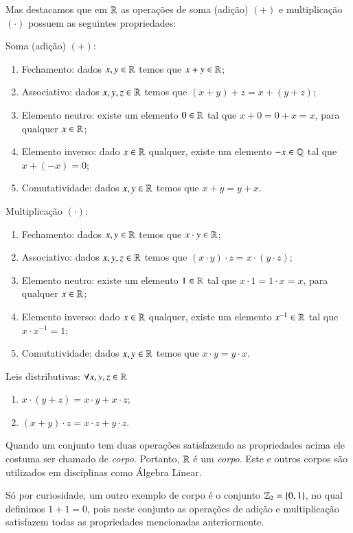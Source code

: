  Mas destacamos que em $\mathbb{R}$ as operações de soma (adição) $(+)$ e multiplicação $(\cdot)$ possuem as seguintes propriedades:

 Soma (adição) $(+)$:
 \begin{enumerate}[1)]
 \item Fechamento: dados $x, y \in \mathbb{R}$ temos que $x+y \in \mathbb{R}$;
 \item Associativo: dados $x, y, z \in \mathbb{R}$ temos que $(x+y)+z= x+(y+z)$;
 \item Elemento neutro: existe um elemento $0 \in \mathbb{R}$ tal que $x+0=0+x=x$, para qualquer $x \in \mathbb{R}$;
 \item Elemento inverso: dado $x \in \mathbb{R}$ qualquer, existe um elemento $-x \in \mathbb{Q}$ tal que $x+(-x)=0$;
 \item Comutatividade: dados $x, y \in \mathbb{R}$ temos que $x+y= y+x$.
 \end{enumerate}

  Multiplicação $(\cdot)$:
 \begin{enumerate}[1)]
 \item Fechamento: dados $x, y \in \mathbb{R}$ temos que $x \cdot y \in \mathbb{R}$;
 \item Associativo: dados $x, y, z \in \mathbb{R}$ temos que $(x \cdot y) \cdot z= x \cdot (y \cdot z)$;
 \item Elemento neutro: existe um elemento $1 \in \mathbb{R}$ tal que $x \cdot 1= 1 \cdot x= x$, para qualquer $x \in \mathbb{R}$;
 \item Elemento inverso: dado $x \in \mathbb{R}$ qualquer, existe um elemento $x^{-1} \in \mathbb{R}$ tal que $x \cdot x^{-1}= 1$;
 \item Comutatividade: dados $x, y \in \mathbb{R}$ temos que $x \cdot y= y \cdot x$.
 \end{enumerate}

  Leis distributivas: $\forall x, y, z \in \mathbb{R}$
 \begin{enumerate}[1)]
 \item $x \cdot (y + z)= x \cdot y + x \cdot z$;
 \item $(x + y) \cdot z= x \cdot z + y \cdot z$.
 \end{enumerate}

   Quando um conjunto tem duas operações satisfazendo as propriedades acima ele costuma ser chamado de \emph{corpo}. Portanto, $\mathbb{R}$ é um \emph{corpo}. Este e outros corpos são utilizados em disciplinas como Álgebra Linear.

   Só por curiosidade, um outro exemplo de corpo é o conjunto $\mathbb{Z}_2= \{0, 1\}$, no qual definimos $1+1=0$, pois neste conjunto as operações de adição e multiplicação satisfazem todas as propriedades mencionadas anteriormente.

